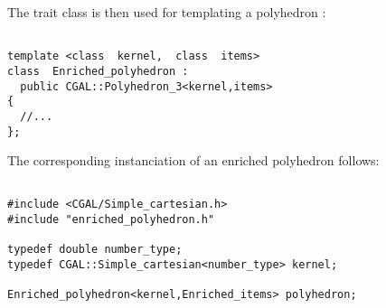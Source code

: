 The trait class is then used for templating a polyhedron
:

{ \scriptsize
\begin{verbatim}

template <class  kernel,  class  items>
class  Enriched_polyhedron :
  public CGAL::Polyhedron_3<kernel,items>
{
  //...
};
\end{verbatim}}

The corresponding instanciation of an enriched polyhedron follows:

{ \scriptsize
\begin{verbatim}

#include <CGAL/Simple_cartesian.h>
#include "enriched_polyhedron.h"

typedef double number_type;
typedef CGAL::Simple_cartesian<number_type> kernel;

Enriched_polyhedron<kernel,Enriched_items> polyhedron;

\end{verbatim}}
